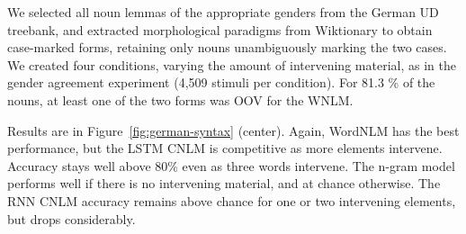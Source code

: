 %

We selected all noun lemmas of the
appropriate genders from the German UD treebank, and extracted
morphological paradigms from Wiktionary to obtain case-marked forms,
retaining only nouns unambiguously marking the two cases.  We created
four conditions, varying the amount of intervening material, as in the
gender agreement experiment (4,509 stimuli per condition).
For 81.3 \% of the nouns, at least one of the two forms was OOV for the WNLM.

Results are in Figure~\ref{fig:german-syntax} (center).  Again, WordNLM has
the best performance, but the LSTM CNLM is competitive as more
elements intervene. Accuracy stays well above 80\% even as three
words intervene.  The n-gram model performs well if there is no
intervening material, and at chance otherwise.  The RNN
CNLM accuracy remains above chance for one or two intervening elements, but
drops considerably.

%
%

